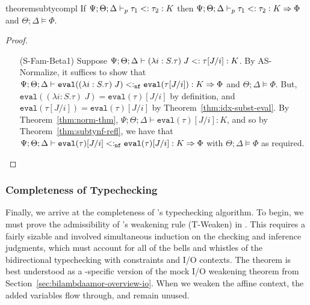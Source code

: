 \begin{restatable}{theorem}{subtycompl}
If $\Psi ; \Theta ; \Delta \vdash_p \tau_1 <: \tau_2 : K$ then  $\Psi ; \Theta ; \Delta \vdash_p \tau_1 <: \tau_2 : K \Rightarrow \Phi$ and $\Theta ; \Delta \vDash \Phi$.
\label{thm:subty-compl}
\end{restatable}
\begin{proof}
~\begin{itemize}
   \item[(S-Fam-Beta1)] Suppose $\Psi ; \Theta ; \Delta \vdash (\lambda i : S. \tau) \; J <: \tau[J/i] : K$. By AS-Normalize, it suffices to show that
   $\Psi ; \Theta ; \Delta \vdash \texttt{eval}((\lambda i : S. \tau) \; J) <:_{\texttt{nf}} \texttt{eval}(\tau[J/i]) : K \Rightarrow \Phi$ and $\Theta ; \Delta \vDash \Phi$.
   But, $\texttt{eval}((\lambda i : S. \tau) \; J) = \texttt{eval}(\tau)[J/i]$ by definition, and $\texttt{eval}(\tau[J/i]) = \texttt{eval}(\tau)[J/i]$ by Theorem~\ref{thm:idx-subst-eval}. By Theorem~\ref{thm:norm-thm},  $\Psi ; \Theta ; \Delta \vdash \texttt{eval}(\tau)[J/i] : K$, and so by Theorem~\ref{thm:subtynf-refl}, we have that $\Psi ; \Theta ; \Delta \vdash \texttt{eval}(\tau)[J/i] <:_{\texttt{nf}} \texttt{eval}(\tau)[J/i] : K \Rightarrow \Phi$ with $\Theta ; \Delta \vDash \Phi$ as required.
 \end{itemize}
\end{proof}

\subsubsection{Completeness of Typechecking}

Finally, we arrive at the completeness of \bilambdaamor's typechecking algorithm. To begin, we must prove the admissibility of \dlambdaamor's weakening rule (T-Weaken) in \bilambdaamor. This requires a fairly sizable and involved simultaneous induction on the checking and inference judgments, which must account for all of the bells and whistles of the bidirectional typechecking with constraints and I/O contexts. The theorem is best understood as a \bilambdaamor -specific version of the mock I/O weakening theorem from Section~\ref{sec:bilambdaamor-overview-io}. When we weaken the affine context, the added variables flow through, and remain unused.


